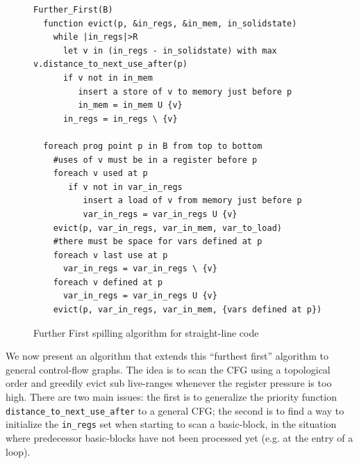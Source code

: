 {\begin{figure}
\begin{verbatim}
Further_First(B)
  function evict(p, &in_regs, &in_mem, in_solidstate)
    while |in_regs|>R
      let v in (in_regs - in_solidstate) with max v.distance_to_next_use_after(p)
      if v not in in_mem 
         insert a store of v to memory just before p
         in_mem = in_mem U {v}
      in_regs = in_regs \ {v}

  foreach prog point p in B from top to bottom
    #uses of v must be in a register before p
    foreach v used at p
       if v not in var_in_regs 
          insert a load of v from memory just before p
          var_in_regs = var_in_regs U {v}
    evict(p, var_in_regs, var_in_mem, var_to_load)
    #there must be space for vars defined at p
    foreach v last use at p  
      var_in_regs = var_in_regs \ {v}
    foreach v defined at p
      var_in_regs = var_in_regs U {v}
    evict(p, var_in_regs, var_in_mem, {vars defined at p})
\end{verbatim}
\caption{\label{fig:ra:ff}Further First spilling algorithm for straight-line code}
\end{figure}

We now present an algorithm that extends this ``furthest first'' algorithm to general control-flow graphs.
The idea is to scan the CFG using a topological order and greedily evict sub live-ranges whenever the register pressure is too high.
There are two main issues:
the first is to generalize the priority function \verb+distance_to_next_use_after+ to a general CFG;
the second is to find a way to initialize the \verb+in_regs+ set when starting to scan a basic-block, in the situation where predecessor basic-blocks have not been processed yet (e.g. at the entry of a loop).

}
